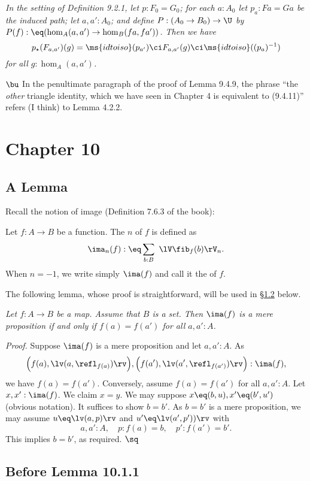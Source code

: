 \documentclass[12pt]{article}
\begin{document}
\emph{In the setting of Definition 9.2.1, let $p:F_0=G_0$; for each $a:A_0$ let $p_a:Fa=Ga$ be the induced path; let $a,a':A_0$; and define $P:(A_0\to B_0)\to\U$ by $P(f):\eq(\hom_A(a,a')\to\hom_B(fa,fa'))$. Then we have} 
$$
p_\star(F_{a,a'})(g)=\ms{idtoiso}(p_{a'})\ci F_{a,a'}(g)\ci\ms{idtoiso}((p_a)^{-1})
$$ 
\emph{for all $g:\hom_A(a,a')$.}

\nn$\bu$ In the penultimate paragraph of the proof of Lemma 9.4.9, the phrase ``the \emph{other} triangle identity, which we have seen in Chapter 4 is equivalent to (9.4.11)'' refers (I think) to Lemma 4.2.2.


\section{Chapter 10}\label{imfmp}

\subsection{A Lemma}

Recall the notion of image (Definition 7.6.3 of the book):

\nn{} Let $f:A\to B$ be a function. The $n$ of $f$ is defined as
$$
\ima_n(f):\eq\sum_{b:B}\ \lV\fib_f(b)\rV_n.
$$ 
When $n=-1$, we write simply $\ima(f)$ and call it the  of $f$.

The following lemma, whose proof is straightforward, will be used in \S\ref{1011} below.

\nn{} \emph{Let $f:A\to B$ be a map. Assume that $B$ is a set. Then $\ima(f)$ is a mere proposition if and only if $f(a)=f(a')$ for all $a,a':A$.}

\nn\emph{Proof.} Suppose $\ima(f)$ is a mere proposition and let $a,a':A$. As 
$$
\Big(f(a),\lv(a,\refl_{f(a)})\rv\Big),\Big(f(a'),\lv(a',\refl_{f(a')})\rv\Big):\ima(f),
$$ 
we have $f(a)=f(a')$. Conversely, assume $f(a)=f(a')$ for all $a,a':A$. Let $x,x':\ima(f)$. We claim $x=y$. We may suppose $x\eq(b,u),x'\eq(b',u')$ (obvious notation). It suffices to show $b=b'$. As $b=b'$ is a mere proposition, we may assume $u\eq\lv(a,p)\rv$ and $u'\eq\lv(a',p'))\rv$ with 
$$
a,a':A,\quad p:f(a)=b,\quad p':f(a')=b'.
$$ 
This implies $b=b'$, as required. $\sq$


\subsection{Before Lemma 10.1.1}\label{1011}
\end{document}
